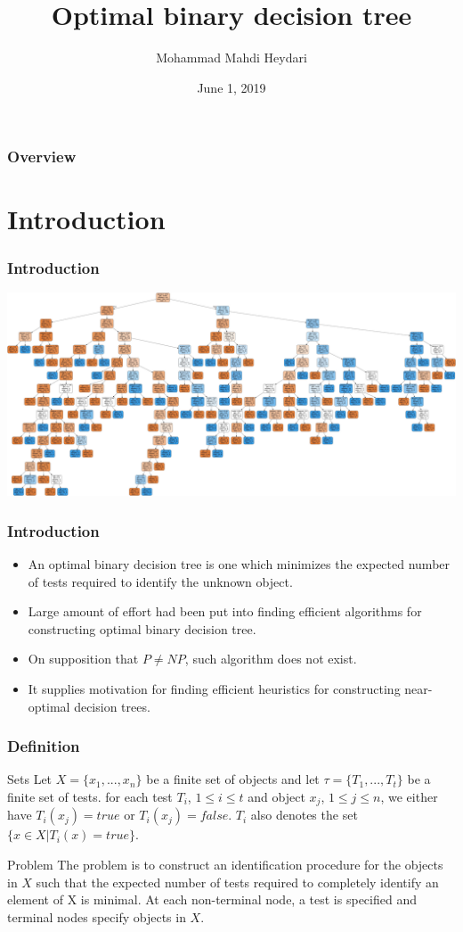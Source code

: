 \documentclass{beamer}
\title[Decision Tree]{Optimal binary decision tree}
\author{Mohammad Mahdi Heydari}
\institute[AUT] 
{
Amirkabir University of Technology \\ 
\medskip
\textit{} 
}
\date{June 1, 2019}
\begin{document}
\begin{frame}
\titlepage 
\end{frame}

\begin{frame}
\frametitle{Overview}
\tableofcontents
\end{frame}

\section{Introduction}
\begin{frame}
	\frametitle{Introduction}
	\includegraphics[width=\linewidth]{Pics/dtree.jpg}
\end{frame}

\begin{frame}
	\frametitle{Introduction}
	\begin{itemize}
	\item
	An optimal binary decision tree is one which minimizes the expected number of tests required to identify the unknown object.	
	\item
	Large amount of effort had been put into finding efficient algorithms for constructing optimal binary decision tree.
	\item
	On supposition that $P \ne NP$, such algorithm does not exist. 
	\item
	It supplies motivation for finding efficient heuristics for constructing near-optimal decision trees.
	\end{itemize}
\end{frame}

\begin{frame}[fragile]
\frametitle{Definition}
	\begin{block}{Sets}
		Let $X=\{x_1, ..., x_n\}$ be a finite set of objects and let $\tau=\{T_1, ..., T_t \}$ be a finite set of tests.
		for each test $T_i$, $1\le i \le t$ and object $x_j$, $1 \le j \le n$, we either have $T_i(x_j)= true$ or $T_i(x_j)= false $.
		$T_i$ also denotes the set $\{x \in X | T_i(x) = true \}$.
	\end{block}

	\begin{block}{Problem}
		The problem is to construct an identification procedure for the objects in $X$ such that the expected number of tests
		required to completely identify an element of X is minimal. At each non-terminal node, a test is specified and terminal
		nodes specify objects in $X$.
	\end{block}
\end{frame}
\end{document}
